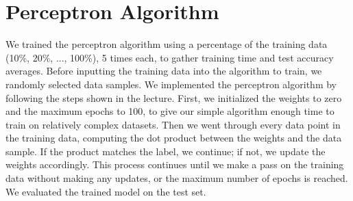 \documentclass{article}
\begin{document}
\section*{Perceptron Algorithm}
We trained the perceptron algorithm using a percentage of the training data (10\%, 20\%, ..., 100\%), 5 times each, to gather training time and test accuracy averages. Before inputting the training data into the algorithm to train, we randomly selected data samples. We implemented the perceptron algorithm by following the steps shown in the lecture. First, we initialized the weights to zero and the maximum epochs to 100, to give our simple algorithm enough time to train on relatively complex datasets. Then we went through every data point in the training data, computing the dot product between the weights and the data sample. If the product matches the label, we continue; if not, we update the weights accordingly. This process continues until we make a pass on the training data without making any updates, or the maximum number of epochs is reached. We evaluated the trained model on the test set. 
\end{document}
